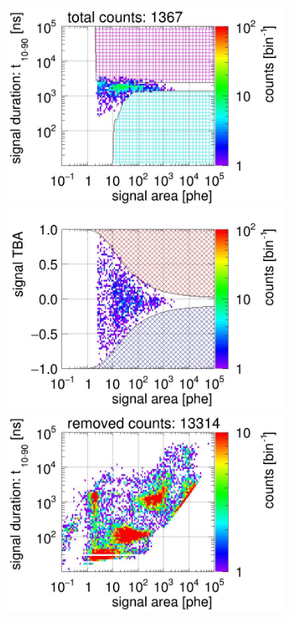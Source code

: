 \begin{landscape}
\begin{figure}[!p]
\begin{subfigure}[t]{0.32\textwidth}
			\includegraphics[width=\figurewidth,clip,trim={0 98 0 15}]{Figures/GasTest/CutsValid/res64767/pdpa23Vecfig64767.jpg}
			\includegraphics[width=\figurewidth,clip,trim={0 98 0 40}]{Figures/GasTest/CutsValid/res64767/tbapa23Vecfig64767.jpg}
			\includegraphics[width=\figurewidth,clip,trim={0 98 0 15}]{Figures/GasTest/CutsValid/res64767/pdpaX23Vecfig64767.jpg}

\end{subfigure}
\end{figure}
\end{landscape}
